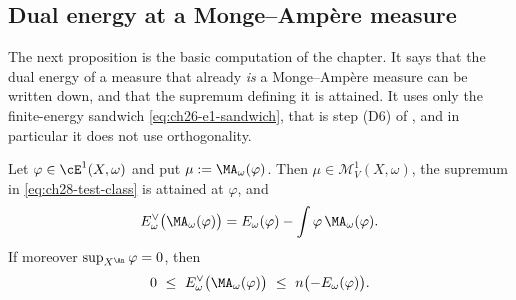 \subsection{Dual energy at a Monge--Amp\`ere measure}
\label{sec:ch28-dual-at-ma}

The next proposition is the basic computation of the chapter.  It says that
the dual energy of a measure that already \emph{is} a Monge--Amp\`ere
measure can be written down, and that the supremum defining it is attained.
It uses only the finite-energy sandwich \eqref{eq:ch26-e1-sandwich}, that is
step \textup{(D6)} of , and in particular it does
not use orthogonality.

\begin{proposition}
\label{prop:ch28-dual-energy-of-ma}
Let $\varphi\in\cE^1(X,\omega)$ and put $\mu:=\MA_\omega(\varphi)$.  Then
$\mu\in\mathcal M^1_V(X,\omega)$, the supremum in
\eqref{eq:ch28-test-class} is attained at $\varphi$, and
\begin{equation}
\label{eq:ch28-dual-energy-of-ma}
 E^\vee_\omega\bigl(\MA_\omega(\varphi)\bigr)
 =E_\omega(\varphi)-\int\varphi\,\MA_\omega(\varphi).
\end{equation}
If moreover $\sup_{X^{\An}}\varphi=0$, then
\begin{equation}
\label{eq:ch28-dual-energy-bracket}
 0\ \leq\ E^\vee_\omega\bigl(\MA_\omega(\varphi)\bigr)
 \ \leq\ n\bigl(-E_\omega(\varphi)\bigr).
\end{equation}
\end{proposition}


